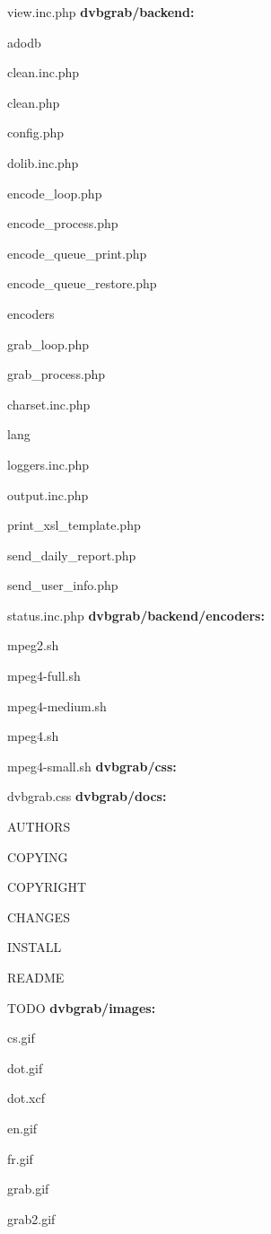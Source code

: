 \item view.inc.php
\vfil
\eitem
\textbf{dvbgrab/backend:}
\bitem
\item adodb
\item clean.inc.php
\item clean.php
\item config.php
\item dolib.inc.php
\item encode\_loop.php
\item encode\_process.php
\item encode\_queue\_print.php
\item encode\_queue\_restore.php
\item encoders
\item grab\_loop.php
\item grab\_process.php
\item charset.inc.php
\item lang
\item loggers.inc.php
\item output.inc.php
\item print\_xsl\_template.php
\item send\_daily\_report.php
\item send\_user\_info.php
\item status.inc.php
\eitem
\textbf{dvbgrab/backend/encoders:}
\bitem
\item mpeg2.sh
\item mpeg4-full.sh
\item mpeg4-medium.sh
\item mpeg4.sh
\item mpeg4-small.sh
\eitem
\textbf{dvbgrab/css:}
\bitem
\item dvbgrab.css
\eitem
\textbf{dvbgrab/docs:}
\bitem
\item AUTHORS
\item COPYING
\item COPYRIGHT
\item CHANGES
\item INSTALL
\item README
\item TODO
\eitem
\textbf{dvbgrab/images:}
\bitem
\item cs.gif
\item dot.gif
\item dot.xcf
\item en.gif
\item fr.gif
\item grab.gif
\item grab2.gif
